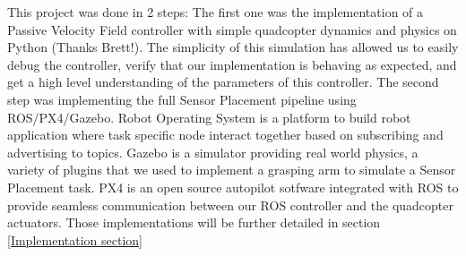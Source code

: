 This project was done in 2 steps: The first one was the implementation of a Passive Velocity Field controller with simple quadcopter dynamics and physics on Python (Thanks Brett!). The simplicity of this simulation has allowed us to easily debug the controller, verify that our implementation is behaving as expected, and get a high level understanding of the parameters of this controller. 
The second step was implementing the full Sensor Placement pipeline using ROS/PX4/Gazebo. Robot Operating System is a platform to build robot application where task specific node interact together based on subscribing and advertising to topics. Gazebo is a simulator providing real world physics, a variety of plugins that we used to implement a grasping arm to simulate a Sensor Placement task. PX4 is an open source autopilot sotfware integrated with ROS to provide seamless communication between our ROS controller and the quadcopter actuators.
Those implementations will be further detailed in section \ref{Implementation section}


